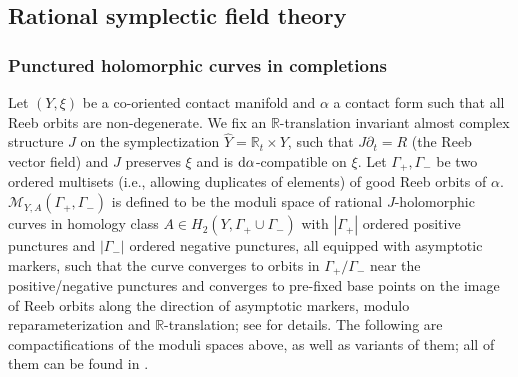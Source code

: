 \documentclass[11pt]{amsart}
\numberwithin{equation}{section}
\def\R{\mathbb{R}}
\def\cM{{\mathcal M}}
\def\rd{{\rm d}}
\begin{document}
\subsection{Rational symplectic field theory}
\subsubsection{Punctured holomorphic curves in completions}
Let $(Y,\xi)$ be a co-oriented contact manifold and $\alpha$ a contact form such that all Reeb orbits are non-degenerate. We fix an $\R$-translation invariant almost complex structure $J$ on the symplectization $\widehat{Y}=\R_t \times Y$, such that $J\partial_t=R$ (the Reeb vector field) and $J$ preserves $\xi$ and is $\rd \alpha$-compatible on $\xi$. Let $\Gamma_+,\Gamma_-$ be two ordered multisets (i.e., allowing duplicates of elements) of good Reeb orbits of $\alpha$. $\cM_{Y,A}(\Gamma_+,\Gamma_-)$ is defined to be the moduli space of rational $J$-holomorphic curves in homology class $A\in H_2(Y,\Gamma_+\cup\Gamma_-)$ with $|\Gamma_+|$ ordered positive punctures and $|\Gamma_-|$ ordered negative punctures, all equipped with asymptotic markers, such that the curve converges to orbits in $\Gamma_+/\Gamma_-$ near the positive/negative punctures and converges to pre-fixed base points on the image of Reeb orbits along the direction of asymptotic markers, modulo reparameterization and $\R$-translation; see \cite[\S 3.2]{moreno2024landscape} for details. The following are compactifications of the moduli spaces above, as well as variants of them; all of them can be found in \cite{moreno2024landscape,moreno2024rsft}. 
\end{document}
